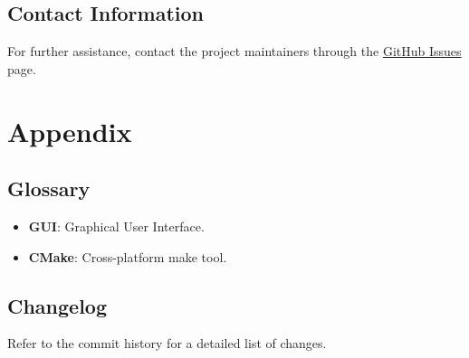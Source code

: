 \documentclass{article}
\begin{document}
\subsection{Contact Information}
For further assistance, contact the project maintainers through the \href{https://github.com/Libra232/BlindChoice/issues}{GitHub Issues} page.

\section{Appendix}

\subsection{Glossary}
\begin{itemize}
    \item \textbf{GUI}: Graphical User Interface.
    \item \textbf{CMake}: Cross-platform make tool.
\end{itemize}

\subsection{Changelog}
Refer to the commit history for a detailed list of changes.
\end{document}
